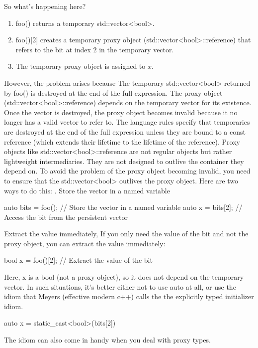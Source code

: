 \documentclass{report}
\begin{document}
\bigbreak \noindent 
So what's happening here?
\begin{enumerate}
    \item foo() returns a temporary std::vector<bool>.
    \item foo()[2] creates a temporary proxy object (std::vector<bool>::reference) that refers to the bit at index 2 in the temporary vector.
    \item The temporary proxy object is assigned to $x$.
\end{enumerate}
However, the problem arises because The temporary std::vector<bool> returned by foo() is destroyed at the end of the full expression.
\bigbreak \noindent 
The proxy object (std::vector<bool>::reference) depends on the temporary vector for its existence. Once the vector is destroyed, the proxy object becomes invalid because it no longer has a valid vector to refer to.
\bigbreak \noindent 
The language rules specify that temporaries are destroyed at the end of the full expression unless they are bound to a const reference (which extends their lifetime to the lifetime of the reference).
\bigbreak \noindent 
Proxy objects like std::vector<bool>::reference are not regular objects but rather lightweight intermediaries. They are not designed to outlive the container they depend on.
\bigbreak \noindent 
To avoid the problem of the proxy object becoming invalid, you need to ensure that the std::vector<bool> outlives the proxy object. Here are two ways to do this:
\bigbreak {}. Store the vector in a named variable
\bigbreak \noindent 
\begin{cppcode}
auto bits = foo(); // Store the vector in a named variable
auto x = bits[2];  // Access the bit from the persistent vector
\end{cppcode}
\bigbreak \noindent 
 Extract the value immediately, If you only need the value of the bit and not the proxy object, you can extract the value immediately:
 \bigbreak \noindent 
 \begin{cppcode}
 bool x = foo()[2]; // Extract the value of the bit
 \end{cppcode}
 \bigbreak \noindent 
 Here, x is a bool (not a proxy object), so it does not depend on the temporary vector.
 \bigbreak \noindent 
 In such situations, it’s better either not to use auto at all, or use the idiom that Meyers (effective modern c++) calls the the explicitly typed initializer idiom.
 \begin{cppcode}
     auto x = static_cast<bool>(bits[2])
 \end{cppcode}
 \bigbreak \noindent 
 The idiom can also come in handy when you deal with proxy types.
\end{document}
